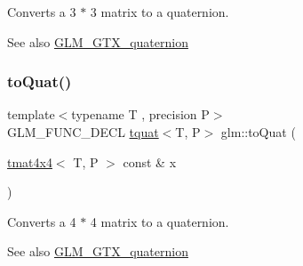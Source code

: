 Converts a 3 $\ast$ 3 matrix to a quaternion.

\begin{DoxySeeAlso}{See also}
\hyperlink{group__gtx__quaternion}{G\+L\+M\+\_\+\+G\+T\+X\+\_\+quaternion} 
\end{DoxySeeAlso}
\mbox{\label{group__gtx__quaternion_ga808dd0f83ee8150db7e652313bde8eb2}} 
\subsubsection{\texorpdfstring{to\+Quat()}{toQuat()}\hspace{0.1cm}{\footnotesize\ttfamily [2/2]}}
{\footnotesize\ttfamily template$<$typename T , precision P$>$ \\
G\+L\+M\+\_\+\+F\+U\+N\+C\+\_\+\+D\+E\+CL \hyperlink{structglm_1_1tquat}{tquat}$<$T, P$>$ glm\+::to\+Quat (\begin{DoxyParamCaption}\item[{\hyperlink{structglm_1_1tmat4x4}{tmat4x4}$<$ T, P $>$ const \&}]{x }\end{DoxyParamCaption})}

Converts a 4 $\ast$ 4 matrix to a quaternion.

\begin{DoxySeeAlso}{See also}
\hyperlink{group__gtx__quaternion}{G\+L\+M\+\_\+\+G\+T\+X\+\_\+quaternion} 
\end{DoxySeeAlso}
